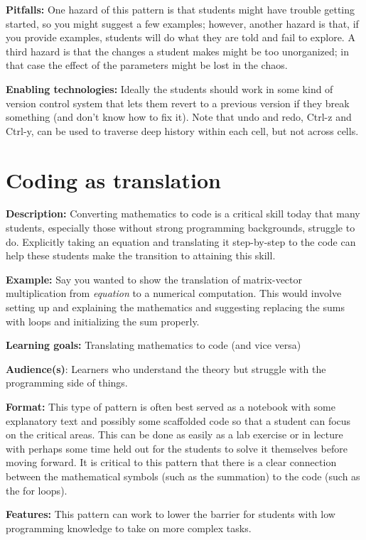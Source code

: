 \documentclass[]{book}
\begin{document}
\textbf{Pitfalls:} One hazard of this pattern is that students might
have trouble getting started, so you might suggest a few examples;
however, another hazard is that, if you provide examples, students will
do what they are told and fail to explore. A third hazard is that the
changes a student makes might be too unorganized; in that case the
effect of the parameters might be lost in the chaos.

\textbf{Enabling technologies:} Ideally the students should work in some
kind of version control system that lets them revert to a previous
version if they break something (and don't know how to fix it). Note
that undo and redo, Ctrl-z and Ctrl-y, can be used to traverse deep
history within each cell, but not across cells.

\section{Coding as translation}\label{coding-as-translation}

\textbf{Description:} Converting mathematics to code is a critical skill
today that many students, especially those without strong programming
backgrounds, struggle to do. Explicitly taking an equation and
translating it step-by-step to the code can help these students make the
transition to attaining this skill.

\textbf{Example:} Say you wanted to show the translation of
matrix-vector multiplication from \emph{equation} to a numerical
computation. This would involve setting up and explaining the
mathematics and suggesting replacing the sums with loops and
initializing the sum properly.

\textbf{Learning goals:} Translating mathematics to code (and vice
versa)

\textbf{Audience(s)}: Learners who understand the theory but struggle
with the programming side of things.

\textbf{Format:} This type of pattern is often best served as a notebook
with some explanatory text and possibly some scaffolded code so that a
student can focus on the critical areas. This can be done as easily as a
lab exercise or in lecture with perhaps some time held out for the
students to solve it themselves before moving forward. It is critical to
this pattern that there is a clear connection between the mathematical
symbols (such as the summation) to the code (such as the for loops).

\textbf{Features:} This pattern can work to lower the barrier for
students with low programming knowledge to take on more complex tasks.
\end{document}

